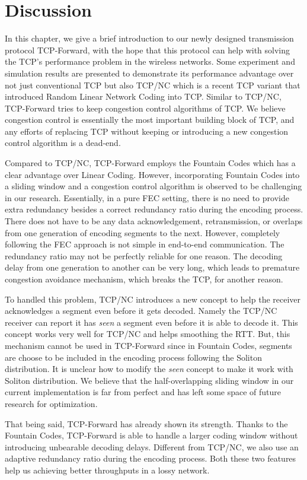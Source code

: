 \documentclass[10pt, conference, final, letterpaper]{IEEEtran}
\theoremstyle{definition}
\begin{document}
\section{Discussion}

In this chapter, we give a brief introduction to our newly designed transmission protocol TCP-Forward, with the hope that this protocol can help with solving the TCP's performance problem in the wireless networks. Some experiment and simulation results are presented to demonstrate its performance advantage over not just conventional TCP but also TCP/NC which is a recent TCP variant that introduced Random Linear Network Coding into TCP. Similar to TCP/NC, TCP-Forward tries to keep congestion control algorithms of TCP. We believe congestion control is essentially the most important building block of TCP, and any efforts of replacing TCP without keeping or introducing a new congestion control algorithm is a dead-end.

Compared to TCP/NC, TCP-Forward employs the Fountain Codes which has a clear advantage over Linear Coding. However, incorporating Fountain Codes into a sliding window and a congestion control algorithm is observed to be challenging in our research. Essentially, in a pure FEC setting, there is no need to provide extra redundancy besides a correct redundancy ratio during the encoding process. There does not have to be any data acknowledgement, retransmission, or overlaps from one generation of encoding segments to the next. However, completely following the FEC approach is not simple in end-to-end communication. The redundancy ratio may not be perfectly reliable for one reason. The decoding delay from one generation to another can be very long, which leads to premature congestion avoidance mechanism, which breaks the TCP, for another reason.

To handled this problem, TCP/NC introduces a new concept to help the receiver acknowledges a segment even before it gets decoded. Namely the TCP/NC receiver can report it has \textit{seen} a segment even before it is able to decode it. This concept works very well for TCP/NC and helps smoothing the RTT. But, this mechanism cannot be used in TCP-Forward since in Fountain Codes, segments are choose to be included in the encoding process following the Soliton distribution. It is unclear how to modify the \textit{seen} concept to make it work with Soliton distribution. We believe that the half-overlapping sliding window in our current implementation is far from perfect and has left some space of future research for optimization.

That being said, TCP-Forward has already shown its strength. Thanks to the Fountain Codes, TCP-Forward is able to handle a larger coding window without introducing unbearable decoding delays. Different from TCP/NC, we also use an adaptive redundancy ratio during the encoding process. Both these two features help us achieving better throughputs in a lossy network.



\end{document}
